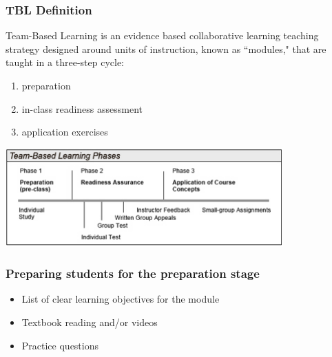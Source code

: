 \documentclass{beamer}
\begin{document}

\begin{frame}
\frametitle{TBL Definition}

Team-Based Learning is an evidence based collaborative learning teaching strategy 
designed around units of instruction, known as ``modules," that are taught in a three-step cycle: 

\begin{enumerate}
\item preparation
\item in-class readiness assessment
\item application exercises
\end{enumerate}

\begin{center}
\includegraphics[width = 0.8\textwidth]{figures/TBLPhases}
\end{center}

\end{frame}


\begin{frame}
\frametitle{Preparing students for the preparation stage}

\begin{itemize}

\item List of clear learning objectives for the module

\item Textbook reading and/or videos

\item Practice questions

\end{itemize}

\end{frame}

\end{document}
